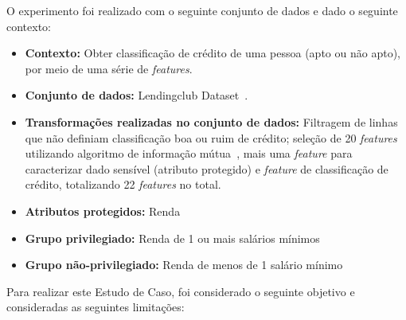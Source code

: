 \documentclass[Portugues,Final]{ic-tese-v3}
\begin{document}
O experimento foi realizado com o seguinte conjunto de dados e dado o seguinte contexto:

\begin{itemize}
\item \textbf{Contexto:} Obter classificação de crédito de uma pessoa (apto ou não apto), por meio de uma série de \textit{features}.

\item \textbf{Conjunto de dados:} Lendingclub Dataset~\cite{lendingclub_2022}.

\item \textbf{Transformações realizadas no conjunto de dados:} Filtragem de linhas que não definiam classificação boa ou ruim de crédito; seleção de 20 \textit{features} utilizando algoritmo de informação mútua~\cite{Ross_2014}, mais uma \textit{feature} para caracterizar dado sensível (atributo protegido) e \textit{feature} de classificação de crédito, totalizando 22 \textit{features} no total.

\item \textbf{Atributos protegidos:} Renda

\item \textbf{Grupo privilegiado:} Renda de 1 ou mais salários mínimos

\item \textbf{Grupo não-privilegiado:} Renda de menos de 1 salário mínimo

\end{itemize}

Para realizar este Estudo de Caso, foi considerado o seguinte objetivo e consideradas as seguintes limitações:
\end{document}
